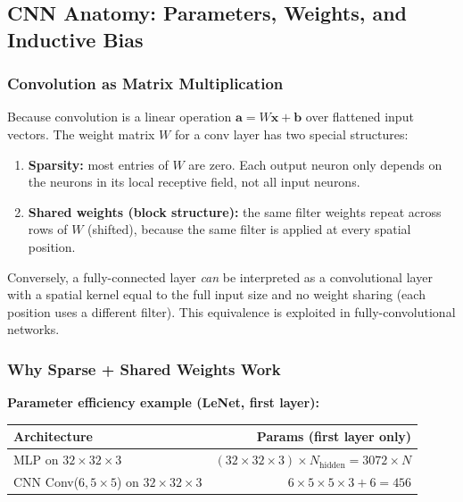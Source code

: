 \documentclass[11pt,a4paper]{article}
\begin{document}
\subsection{CNN Anatomy: Parameters, Weights, and Inductive Bias}
\label{sec:cnn_anatomy}

\subsubsection{Convolution as Matrix Multiplication}

Because convolution is a linear operation $\mathbf{a} = W\mathbf{x} + \mathbf{b}$ over flattened input vectors. The weight matrix $W$ for a conv layer has two special structures:

\begin{enumerate}
  \item \textbf{Sparsity:} most entries of $W$ are zero. Each output neuron only depends on the neurons in its local receptive field, not all input neurons.
  \item \textbf{Shared weights (block structure):} the same filter weights repeat across rows of $W$ (shifted), because the same filter is applied at every spatial position.
\end{enumerate}

Conversely, a fully-connected layer \emph{can} be interpreted as a convolutional layer with a spatial kernel equal to the full input size and no weight sharing (each position uses a different filter). This equivalence is exploited in fully-convolutional networks.

\subsubsection{Why Sparse + Shared Weights Work}

\begin{tcolorbox}[colback=LightBlue,colframe=AccentBlue,boxrule=0.8pt,arc=3pt]
\textbf{Parameter efficiency example (LeNet, first layer):}\\[4pt]
\begin{tabular}{@{}lr@{}}
\toprule
Architecture & Params (first layer only) \\
\midrule
MLP on $32\times32\times3$ & $(32\times32\times3)\times N_{\text{hidden}} = 3072\times N$ \\
CNN Conv($6, 5\times5$) on $32\times32\times3$ & $6\times5\times5\times3 + 6 = 456$ \\
\bottomrule
\end{tabular}
\end{tcolorbox}
\end{document}
